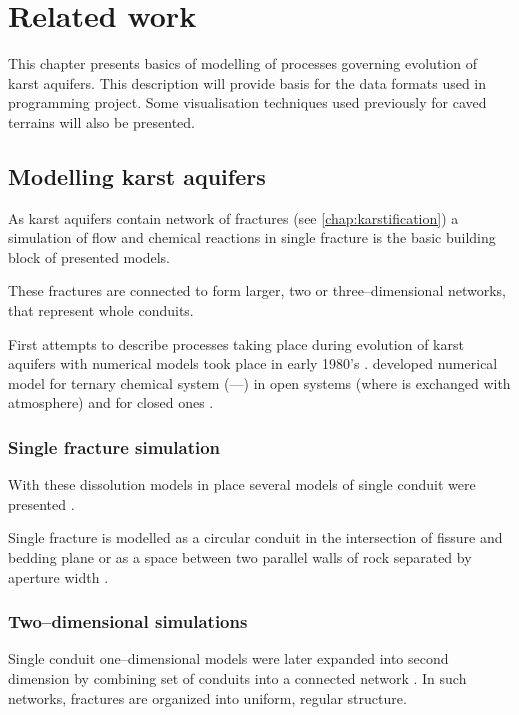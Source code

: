 \chapter{Related work}
\label{chap:related}

This chapter presents basics of modelling of processes governing evolution of
karst aquifers. This description will provide basis for the data formats
used in programming project. Some visualisation techniques used previously for
caved terrains will also be presented.

\section{Modelling karst aquifers}

As karst aquifers contain network of fractures (see \autoref{chap:karstification})
a simulation of flow and chemical reactions in single fracture is the basic
building block of presented models.

These fractures are connected to form larger, two or three--dimensional networks,
that represent whole conduits.

First attempts to describe processes taking place during evolution of karst
aquifers with numerical models took place in early 1980's \parencite[p. 3]{hiller2013}.
\Cite{Buhmann1985189} developed numerical model for ternary chemical system
(----) in open systems (where  is exchanged
with atmosphere) and for closed ones \parencite{Buhmann1985109}.

\subsection{Single fracture simulation}

With these dissolution models in place several models of single conduit were
presented \parencite[pp. 4]{hiller2013}.

Single fracture is modelled as a circular conduit in the intersection
of fissure and bedding plane \parencite{Kaufmann200962} or as a space between
two parallel walls of rock separated by aperture width \parencite{dreybrodt2002}.

\subsection{Two--dimensional simulations}

Single conduit one--dimensional models were later expanded into second dimension
by combining set of conduits into a connected network \parencite[pp. 4--5]{hiller2013}.
In such networks, fractures are organized into uniform, regular structure.


